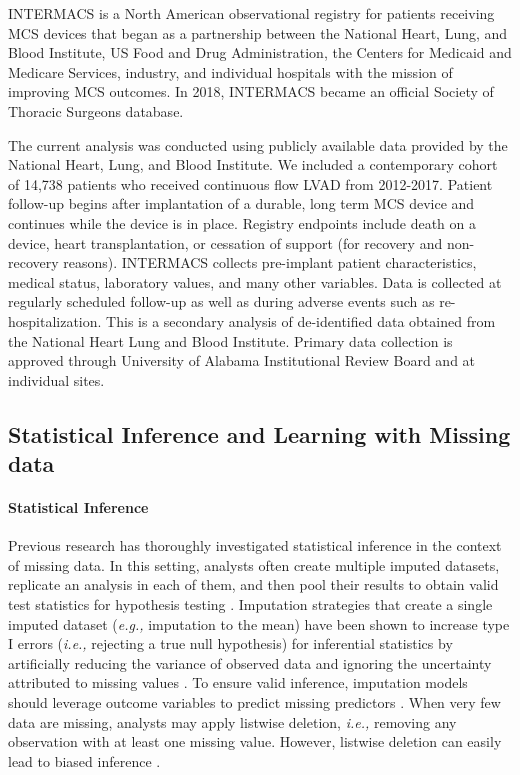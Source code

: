 \documentclass{article}
\begin{document}
\label{subsec:intermacs}

INTERMACS is a North American observational registry for patients
receiving MCS devices that began as a partnership between the National
Heart, Lung, and Blood Institute, US Food and Drug Administration, the
Centers for Medicaid and Medicare Services, industry, and individual
hospitals with the mission of improving MCS outcomes. In 2018, INTERMACS
became an official Society of Thoracic Surgeons database.

The current analysis was conducted using publicly available data
provided by the National Heart, Lung, and Blood Institute. We included a
contemporary cohort of 14,738 patients who received continuous flow LVAD
from 2012-2017. Patient follow-up begins after implantation of a
durable, long term MCS device and continues while the device is in
place. Registry endpoints include death on a device, heart
transplantation, or cessation of support (for recovery and non-recovery
reasons). INTERMACS collects pre-implant patient characteristics,
medical status, laboratory values, and many other variables. Data is
collected at regularly scheduled follow-up as well as during adverse
events such as re-hospitalization. This is a secondary analysis of
de-identified data obtained from the National Heart Lung and Blood
Institute. Primary data collection is approved through University of
Alabama Institutional Review Board and at individual sites.

\hypertarget{statistical-inference-and-learning-with-missing-data}{%
\subsection{Statistical Inference and Learning with Missing
data}\label{statistical-inference-and-learning-with-missing-data}}

\label{subsec:inference_and_learning}

\paragraph{Statistical Inference}

Previous research has thoroughly investigated statistical inference in
the context of missing data. In this setting, analysts often create
multiple imputed datasets, replicate an analysis in each of them, and
then pool their results to obtain valid test statistics for hypothesis
testing \cite{rubin2004multiple}. Imputation strategies that create a
single imputed dataset (\textit{e.g., }imputation to the mean) have been
shown to increase type I errors (\textit{i.e., }rejecting a true null
hypothesis) for inferential statistics by artificially reducing the
variance of observed data and ignoring the uncertainty attributed to
missing values \cite{van2018flexible}. To ensure valid inference,
imputation models should leverage outcome variables to predict missing
predictors \cite{sterne2009multiple}. When very few data are missing,
analysts may apply listwise deletion, \textit{i.e., }removing any
observation with at least one missing value. However, listwise deletion
can easily lead to biased inference \cite{van2020rebutting}.
\end{document}
